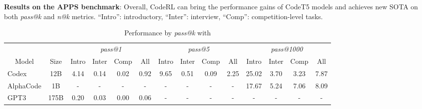 \documentclass{article}
\begin{document}
\begin{table}[t]
\centering
\caption{\textbf{Results on the APPS benchmark}: 
Overall, CodeRL can bring the performance gains of CodeT5 models and achieves new SOTA on both \emph{pass@k} and \emph{n@k} metrics.
``Intro'': introductory, ``Inter'': interview, ``Comp'': competition-level tasks.
}
\begin{subtable}[htbp]{1.0\textwidth}
\centering
\caption{Performance by \emph{pass@k} with }
\label{tab:pass_k}
\resizebox{1.0\textwidth}{!} {
\begin{tabular}{lc|cccc|cccc|cccc}
\hline
\multicolumn{1}{c}{}                        &                        & \multicolumn{4}{c|}{\emph{pass@1}}                                       & \multicolumn{4}{c|}{\emph{pass@5}}                                        & \multicolumn{4}{c}{\emph{pass@1000}}                                        \\ 
\cline{3-14}
\multicolumn{1}{c}{\multirow{-2}{*}{Model}} & \multirow{-2}{*}{Size} & Intro         & Inter         & Comp          & All           & Intro          & Inter         & Comp          & All           & Intro          & Inter          & Comp           & All            \\\hline
Codex                                       & 12B                    & 4.14          & 0.14          & 0.02          & 0.92          & 9.65           & 0.51          & 0.09          & 2.25          & 25.02          & 3.70           & 3.23           & 7.87           \\
AlphaCode                                   & 1B                     & -             & -             & -             & -             & -              & -             & -             & -             & 17.67          & 5.24           & 7.06           & 8.09           \\
GPT3                                        & 175B                   & 0.20          & 0.03          & 0.00          & 0.06          & -           & -          & -          & -          & -              & -              & -              & -              \\


\end{tabular}}
\end{subtable}
\end{table}
\end{document}
